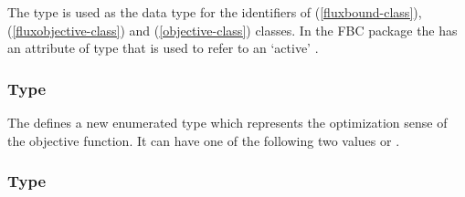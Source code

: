 The  type is used as the data type for the identifiers of \FluxBound (\ref{fluxbound-class}), \FluxObjective (\ref{fluxobjective-class}) and \Objective (\ref{objective-class}) classes. In the FBC package the \ListOfObjectives has an attribute of type  that is used to refer to an `active' \Objective.

%

%

\subsubsection{Type }
\label{primtype-fbctype}

The \FBCPackage defines a new enumerated type  which
represents the optimization sense of the objective function. It can have one
of the following two values  or .

\subsubsection{Type }
\label{primtype-fbcoperation}

